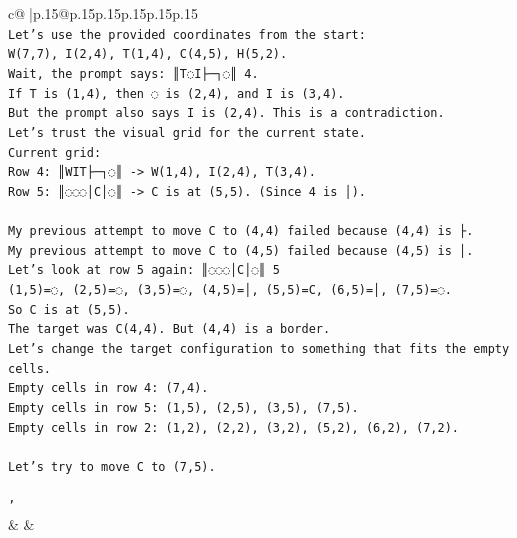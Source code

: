 \documentclass{article}
\begin{document}
{\begin{supertabular}{c@{$\;$}|p{.15\linewidth}@{}p{.15\linewidth}p{.15\linewidth}p{.15\linewidth}p{.15\linewidth}p{.15\linewidth}}
{{{\\ 
\texttt{Let's use the provided coordinates from the start:} \\
\texttt{W(7,7), I(2,4), T(1,4), C(4,5), H(5,2).} \\
\texttt{Wait, the prompt says: ║T◌I├─┐◌║ 4.} \\
\texttt{If T is (1,4), then ◌ is (2,4), and I is (3,4).} \\
\texttt{But the prompt also says I is (2,4). This is a contradiction.} \\
\texttt{Let's trust the visual grid for the current state.} \\
\texttt{Current grid:} \\
\texttt{Row 4: ║WIT├─┐◌║ {-}> W(1,4), I(2,4), T(3,4).} \\
\texttt{Row 5: ║◌◌◌│C│◌║ {-}> C is at (5,5). (Since 4 is │).} \\
\\ 
\texttt{My previous attempt to move C to (4,4) failed because (4,4) is ├.} \\
\texttt{My previous attempt to move C to (4,5) failed because (4,5) is │.} \\
\texttt{Let's look at row 5 again: ║◌◌◌│C│◌║ 5} \\
\texttt{(1,5)=◌, (2,5)=◌, (3,5)=◌, (4,5)=│, (5,5)=C, (6,5)=│, (7,5)=◌.} \\
\texttt{So C is at (5,5).} \\
\texttt{The target was C(4,4). But (4,4) is a border.} \\
\texttt{Let's change the target configuration to something that fits the empty cells.} \\
\texttt{Empty cells in row 4: (7,4).} \\
\texttt{Empty cells in row 5: (1,5), (2,5), (3,5), (7,5).} \\
\texttt{Empty cells in row 2: (1,2), (2,2), (3,2), (5,2), (6,2), (7,2).} \\
\\ 
\texttt{Let's try to move C to (7,5).} \\
\\ 
\texttt{'} \\
            }
        }
    }
    & & \\ \\


\end{supertabular}}
\end{document}

